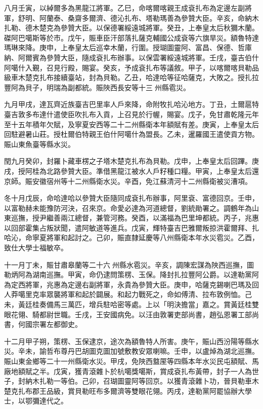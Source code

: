 \begin{pinyinscope}
八月壬寅，以綽爾多為黑龍江將軍。乙巳，命喀爾喀親王成袞扎布為定邊左副將軍，舒明、阿蘭泰、桑齋多爾濟、德沁扎布、塔勒瑪善為參贊大臣。辛亥，命納木扎勒、德木楚克為參贊大臣。以保德署綏遠城將軍。癸丑，上奉皇太后秋獮木蘭。磔阿巴噶斯等於市。戊午，賑車臣汗部落扎薩克輔國公成袞等六旗旱災。額魯特達瑪琳來降。庚申，上奉皇太后巡幸木蘭，行圍。授瑚圖靈阿、富昌、保德、哲庫納、阿爾賓為參贊大臣，隨成袞扎布辦事。以保雲署綏遠城將軍。壬戌，臺吉伯什阿噶什入覲，召見行殿，賜宴。癸亥，予成袞扎布等議敘。甲子，以喀爾喀貝勒品級車木楚克扎布接續臺站，封為貝勒。乙丑，哈達哈等征哈薩克，大敗之。授扎拉豐阿為貝子，明瑞為副都統。賑陜西長安等十三州縣雹災。

九月甲戌，達瓦齊近族臺吉巴里率人戶來降，命附牧扎哈沁地方。丁丑，土爾扈特臺吉敦多布達什遣使臣吹扎布入貢，上召見於行幄，賜宴。戊子，免甘肅乾隆元年至十五年積年欠賦，及寧夏安西等二十二州縣衛本年額賦有差。庚寅，上奉皇太后回駐避暑山莊。授杜爾伯特親王伯什阿噶什為盟長。乙未，暹羅國王遣使貢方物。賑山東魚臺等縣水災。

閏九月癸卯，封羅卜藏車楞之子塔木楚克扎布為貝勒。戊申，上奉皇太后回蹕。庚戌，授阿桂為北路參贊大臣。準借黑龍江被水人戶籽種口糧。甲寅，上奉皇太后還京師。賑安徽宿州等十二州縣衛水災。辛酉，免江蘇清河十二州縣衛被災漕項。

冬十月戊辰，命哈達哈以參贊大臣隨同成袞扎布辦事，阿里袞、富德回京。壬申，以富勒赫未能豫防河決，召來京。命愛必達為河道總督，劉統勛署之。調鶴年為山東巡撫，授尹繼善兩江總督，兼管河務。癸酉，以滿福為巴里坤都統。丙子，兆惠以回部霍集占叛狀聞，遣阿敏道等進兵。戊寅，輝特臺吉巴雅爾叛掠洪霍爾拜、扎哈沁，命寧夏將軍和起討之。己卯，賑直隸延慶等八州縣衛本年水災雹災。乙酉，致仕大學士福敏卒。

十一月丁未，賑甘肅皋蘭等二十六州縣水雹災。辛亥，調陳宏謀為陜西巡撫，圖勒炳阿為湖南巡撫。甲寅，命仍逮問策楞、玉保。降封扎拉豐阿公爵。以達勒黨阿為定西將軍，兆惠為定邊右副將軍，永貴為參贊大臣。庚申，哈薩克錫喇巴瑪及回人莽噶里克率眾襲將軍和起於闢展。和起力戰死之，命如傅清、拉布敦例恤。己未，黃廷桂奏備馬三萬匹，增兵駐哈密等處。上以「明決擔當」嘉之。賞黃廷桂雙眼花翎、騎都尉世職。壬戌，王安國病免。以汪由敦署吏部尚書，趙弘恩署工部尚書，何國宗署左都御史。

十二月甲子朔，策楞、玉保逮京，途次為額魯特人所害。庚午，賑山西汾陽等縣水災。辛未，諭哲布尊丹巴胡圖克圖加號敷教安眾喇嘛。壬申，以盧焯為湖北巡撫。賑山東金鄉等二十一州縣衛水災。甲戌，免陜西盩厔等四縣本年水災民屯額賦、馬廠地額賦之半。戊寅，獲青滾雜卜於杭噶獎噶斯，賞成袞扎布黃帶，封子一人為世子，封納木扎勒一等伯。己卯，召瑚圖靈阿等回京。以獲青滾雜卜功，晉貝勒車木楚克扎布郡王品級，賞貝勒旺布多爾濟等雙眼花翎。丙戌，達勒黨阿罷協辦大學士，以鄂彌達代之。


\end{pinyinscope}
